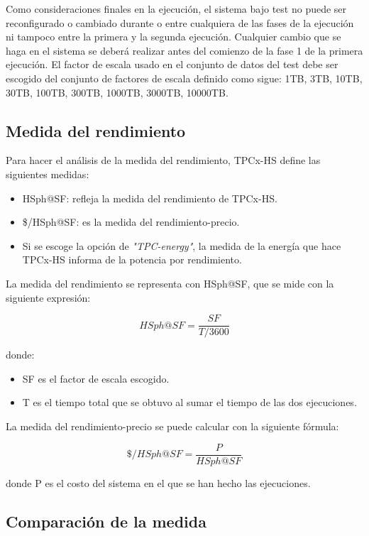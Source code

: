 \documentclass[10pt]{article}
\begin{document}
		Como consideraciones finales en la ejecución, el sistema bajo test no puede ser reconfigurado o cambiado durante o entre cualquiera de las fases de la ejecución ni tampoco entre la primera y la segunda ejecución. Cualquier cambio que se haga en el sistema se deberá realizar antes del comienzo de la fase 1 de la primera ejecución. El factor de escala usado en el conjunto de datos del test debe ser escogido del conjunto de factores de escala definido como sigue: 1TB, 3TB, 10TB, 30TB, 100TB, 300TB, 1000TB, 3000TB, 10000TB.
	
	\subsection{Medida del rendimiento}
	
		Para hacer el análisis de la medida del rendimiento, TPCx-HS define las siguientes medidas:
		
		\begin{itemize}
			\item HSph@SF: refleja la medida del rendimiento de TPCx-HS.
			\item \$/HSph@SF: es la medida del rendimiento-precio.
			\item Si se escoge la opción de \textit{"TPC-energy"}, la medida de la energía que hace TPCx-HS informa de la potencia por rendimiento. \\
		\end{itemize}
		
		La medida del rendimiento se representa con HSph@SF, que se mide con la siguiente expresión:
		
		$$ HSph@SF = \frac{SF}{T/3600} $$
		
		donde:
		\begin{itemize}
			\item SF es el factor de escala escogido.
			\item T es el tiempo total que se obtuvo al sumar el tiempo de las dos ejecuciones. \\
		\end{itemize}	
		
		La medida del rendimiento-precio se puede calcular con la siguiente fórmula:
		
		$$ \$/HSph@SF = \frac{P}{HSph@SF} $$
		
		donde P es el costo del sistema en el que se han hecho las ejecuciones.
		
		\subsection{Comparación de la medida}
		
\end{document}
